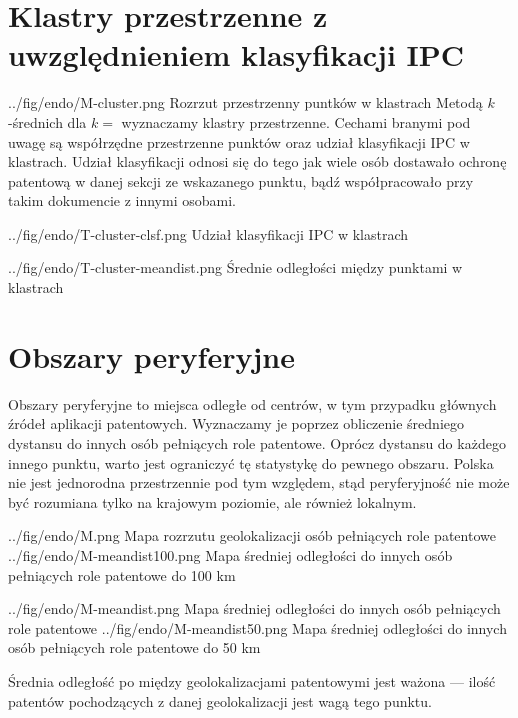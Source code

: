 \newpage
\section{Klastry przestrzenne z uwzględnieniem klasyfikacji \ac{IPC}}

\figside
  {../fig/endo/M-cluster.png}
    {Rozrzut przestrzenny puntków w klastrach}
{
  Metodą $k$-średnich dla $k=$ wyznaczamy klastry przestrzenne. 
  Cechami branymi pod uwagę są współrzędne przestrzenne punktów oraz
  udział klasyfikacji \ac{IPC} w klastrach. Udział klasyfikacji
  odnosi się do tego jak wiele osób dostawało ochronę patentową
  w danej sekcji ze wskazanego punktu, bądź współpracowało przy
  takim dokumencie z innymi osobami.
}

\tblside
  {../fig/endo/T-cluster-clsf.png}
    {Udział klasyfikacji \ac{IPC} w klastrach}

\tblside
  {../fig/endo/T-cluster-meandist.png}
    {Średnie odległości między punktami w klastrach}



\newpage
\section{Obszary peryferyjne}

Obszary peryferyjne to miejsca odległe od centrów, w tym przypadku
głównych źródeł aplikacji patentowych. Wyznaczamy je poprzez obliczenie
średniego dystansu do innych osób pełniących role patentowe.
Oprócz dystansu do każdego innego punktu, warto jest ograniczyć
tę statystykę do pewnego obszaru. Polska nie jest jednorodna przestrzennie 
pod tym względem, stąd peryferyjność nie może być rozumiana tylko 
na krajowym poziomie, ale również lokalnym.

\figsides
  {../fig/endo/M.png}
    {Mapa rozrzutu geolokalizacji osób pełniących role patentowe}
  {../fig/endo/M-meandist100.png}
    {Mapa średniej odległości do innych osób pełniących role patentowe do 100 km}

\figsides
  {../fig/endo/M-meandist.png}
    {Mapa średniej odległości do innych osób pełniących role patentowe}
  {../fig/endo/M-meandist50.png}
    {Mapa średniej odległości do innych osób pełniących role patentowe do 50 km}

\newpage
{}
{
  \begin{uwaga}
  Średnia odległość po między geolokalizacjami patentowymi jest ważona ---
  ilość patentów pochodzących z danej geolokalizacji jest wagą tego punktu.
  \end{uwaga}
}

